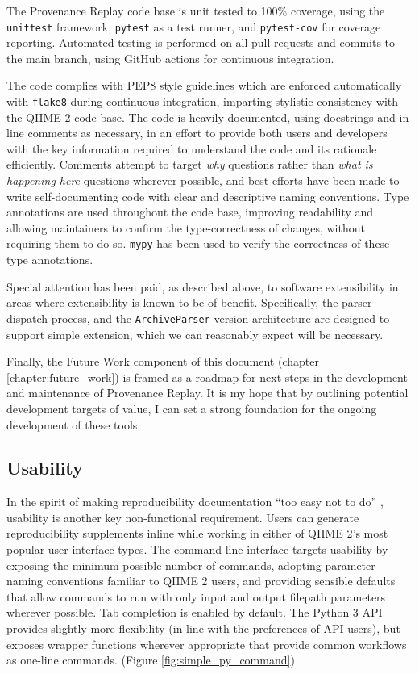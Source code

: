 The Provenance Replay code base is unit tested to 100\% coverage, using
the \texttt{unittest} \parencite{python_software_foundation_unittest_2001} framework,
\texttt{pytest} \parencite{krekel_pytest_2015} as a test runner, and \texttt{pytest-cov} \parencite{pytest-cov_contributors_welcome_2016}
for coverage reporting. Automated testing is performed on all pull requests and
commits to the main branch, using GitHub actions
\parencite{github_features_2022} for continuous integration.

The code complies with PEP8 style guidelines \parencite{van_rossum_pep_2001}
which are enforced automatically with \texttt{flake8} during continuous integration,
imparting stylistic consistency with the QIIME 2 code base. The code is heavily
documented, using docstrings and in-line comments as necessary, in an effort to
provide both users and developers with the key information required to
understand the code and its rationale efficiently. Comments attempt to target
\textit{why} questions rather than \textit{what is happening here} questions
wherever possible, and best efforts have been made to write self-documenting
code with clear and descriptive naming conventions. Type annotations
are used throughout the code base, improving readability and allowing
maintainers to confirm the type-correctness of changes, without requiring them
to do so. \texttt{mypy} \parencite{lehtosalo_mypy_2014} has been used to verify
the correctness of these type annotations.

Special attention has been paid, as described above, to software extensibility
in areas where extensibility is known to be of benefit. Specifically, the parser
dispatch process, and the \texttt{ArchiveParser} version architecture are designed to
support simple extension, which we can reasonably expect will be necessary. 

Finally, the Future Work component of this document (chapter \ref{chapter:future_work})
is framed as a roadmap for next steps in the development and maintenance of
Provenance Replay. It is my hope that by outlining potential development targets
of value, I can set a strong foundation for the ongoing development of these
tools.


\subsection{Usability}

In the spirit of making reproducibility documentation “too easy not to do” \parencite[19]{whitaker_turing_2019},
usability is another key non-functional requirement. Users can generate
reproducibility supplements inline while working in either of QIIME 2’s most
popular user interface types. The command line interface targets usability by
exposing the minimum possible number of commands, adopting parameter naming
conventions familiar to QIIME 2 users, and providing sensible defaults that
allow commands to run with only input and output filepath parameters wherever
possible. Tab completion is enabled by default. The Python 3 API provides
slightly more flexibility (in line with the preferences of API users), but
exposes wrapper functions wherever appropriate that provide common workflows as
one-line commands. (Figure \ref{fig:simple_py_command})

